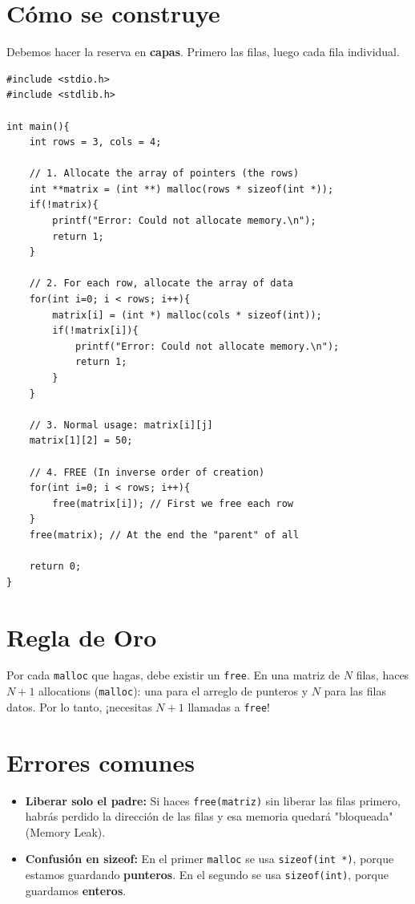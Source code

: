 \documentclass[12pt,a4paper]{article}
\begin{document}
\section{Cómo se construye}
Debemos hacer la reserva en \textbf{capas}. Primero las filas, luego cada fila individual.

\begin{lstlisting}
#include <stdio.h>
#include <stdlib.h>

int main(){
    int rows = 3, cols = 4;

    // 1. Allocate the array of pointers (the rows)
    int **matrix = (int **) malloc(rows * sizeof(int *));
    if(!matrix){
        printf("Error: Could not allocate memory.\n");
        return 1;
    }

    // 2. For each row, allocate the array of data
    for(int i=0; i < rows; i++){
        matrix[i] = (int *) malloc(cols * sizeof(int));
        if(!matrix[i]){
            printf("Error: Could not allocate memory.\n");
            return 1;
        }
    }

    // 3. Normal usage: matrix[i][j]
    matrix[1][2] = 50;
    
    // 4. FREE (In inverse order of creation)
    for(int i=0; i < rows; i++){
        free(matrix[i]); // First we free each row
    }
    free(matrix); // At the end the "parent" of all
    
    return 0;
}
\end{lstlisting}

\section{Regla de Oro}
Por cada \texttt{malloc} que hagas, debe existir un \texttt{free}.
En una matriz de $N$ filas, haces $N+1$ allocations (\texttt{malloc}): una para el arreglo de punteros y $N$ para las filas datos. Por lo tanto, ¡necesitas $N+1$ llamadas a \texttt{free}!

\section{Errores comunes}
\begin{itemize}
    \item \textbf{Liberar solo el padre:} Si haces \texttt{free(matriz)} sin liberar las filas primero, habrás perdido la dirección de las filas y esa memoria quedará "bloqueada" (Memory Leak).
    \item \textbf{Confusión en sizeof:} En el primer \texttt{malloc} se usa \texttt{sizeof(int *)}, porque estamos guardando \textbf{punteros}. En el segundo se usa \texttt{sizeof(int)}, porque guardamos \textbf{enteros}.
\end{itemize}
\end{document}
